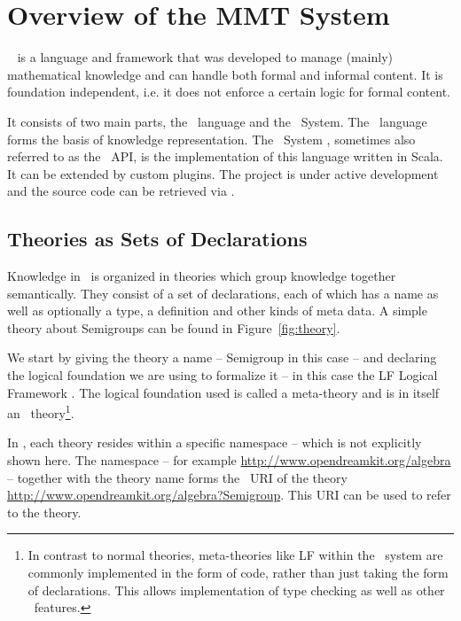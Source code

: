 \section{Overview of the MMT System}\label{sec:mmt}

\mmt\ \cite{Rabe:MMTLanguageSystem09} is a language and framework that was developed to manage (mainly) mathematical knowledge and can handle both formal and informal content.
It is foundation independent, i.e. it does not enforce a certain logic for formal content.

It consists of two main parts, the \omdocmmt\ language and the \mmt\ System.
The \omdocmmt\ language \cite{rabe:mmt:09} forms the basis of knowledge representation.
The \mmt\ System \cite{Rabe:MMT}, sometimes also referred to as the \mmt\ API, is the implementation of this language written in Scala.
It can be extended by custom plugins.
The project is under active development and the source code can be retrieved via \cite{uniformal:on}.

\subsection{Theories as Sets of Declarations}\label{sec:mmt:theories}

Knowledge in \omdocmmt\ is organized in theories which group knowledge together semantically.
They consist of a set of declarations, each of which has a name as well as optionally a type, a definition and other kinds of meta data.
A simple theory about Semigroups can be found in Figure~\ref{fig:theory}.



We start by giving the theory a name -- Semigroup in this case -- and declaring the logical foundation we are using to formalize it -- in this case the LF Logical Framework \cite{Pfenning91}.
The logical foundation used is called a meta-theory and is in itself an \omdocmmt\ theory\footnote{
    In contrast to normal theories, meta-theories like LF within the \mmt\ system are commonly implemented in the form of code, rather than just taking the form of declarations.
    This allows implementation of type checking as well as other \mmt\ features.
}.

In \mmt, each theory resides within a specific namespace -- which is not explicitly shown here.
The namespace -- for example \url{http://www.opendreamkit.org/algebra} -- together with the theory name  forms the \mmt\ URI of the theory \url{http://www.opendreamkit.org/algebra?Semigroup}.
This URI can be used to refer to the theory.

